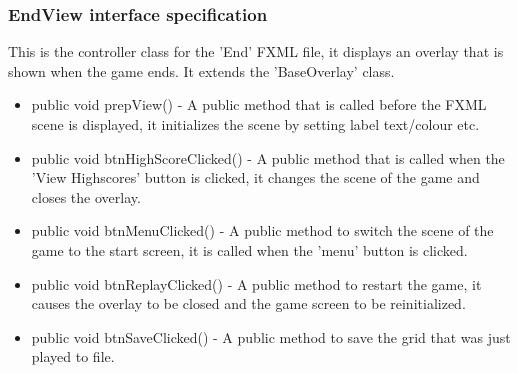         \subsubsection{EndView interface specification}
        	This is the controller class for the 'End' FXML file, it displays an overlay that is shown when the game ends. It extends the 'BaseOverlay' class.
            \begin{itemize}
            	\item public void prepView() - A public method that is called before the FXML scene is displayed, it initializes the scene by setting label text/colour etc.
                \item public void btnHighScoreClicked() - A public method that is called when the 'View Highscores' button is clicked, it changes the scene of the game and closes the overlay.
                \item public void btnMenuClicked() - A public method to switch the scene of the game to the start screen, it is called when the 'menu' button is clicked.
                \item public void btnReplayClicked() - A public method to restart the game, it causes the overlay to be closed and the game screen to be reinitialized.
                \item public void btnSaveClicked() - A public method to save the grid that was just played to file.
            \end{itemize}

